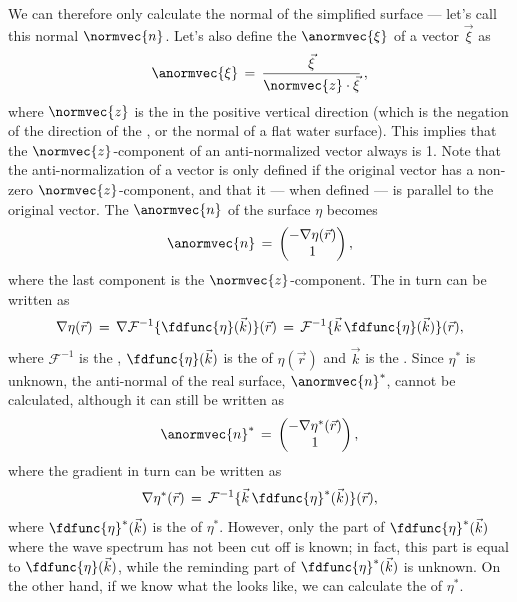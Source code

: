 We can therefore only calculate the normal of the simplified surface --- let's call this normal $\normvec{n}$. Let's also define the  $\anormvec{\xi}$ of a vector $\vec{\xi}$ as
%
\begin{equation} \label{eq:anti_normal_definition}
\anormvec{\xi} \,=\, \frac{\vec{\xi}}{\normvec{z}\cdot\vec{\xi}}\,,
\end{equation}
%
where $\normvec{z}$ is the  in the positive vertical direction (which is the negation of the direction of the , or the normal of a flat water surface). This implies that the $\normvec{z}$-component of an anti-normalized vector always is 1. Note that the anti-normalization of a vector is only defined if the original vector has a non-zero $\normvec{z}$-component, and that it --- when defined --- is parallel to the original vector. The  $\anormvec{n}$ of the surface $\eta$ becomes
%
\begin{equation} \label{eq:anti_normal_from_gradient}
\anormvec{n} \,=\, \left(\!\!\!\begin{array}{c}-\nabla\eta(\vec{r}) \\ 1\end{array}\!\!\!\right),
\end{equation}
%
where the last component is the $\normvec{z}$-component. The \gradient in turn can be written as
%
\begin{equation}
\nabla\eta(\vec{r}) \,=\, \nabla\mathcal{F}^{-1}\{\fdfunc{\eta}(\vec{k})\}(\vec{r}) \,=\, \mathcal{F}^{-1}\{\vec{k}\,\fdfunc{\eta}(\vec{k})\}(\vec{r}),
\end{equation}
%
where $\mathcal{F}^{-1}$ is the , $\fdfunc{\eta}(\vec{k})$ is the  of $\eta(\vec{r})$ and $\vec{k}$ is the . Since $\eta^*$ is unknown, the anti-normal of the real surface, $\anormvec{n}^*$, cannot be calculated, although it can still be written as
%
\begin{equation} \label{eq:eta_anti_normal}
\anormvec{n}^* \,=\, \left(\!\!\!\begin{array}{c}-\nabla\eta^*(\vec{r}) \\ 1\end{array}\!\!\!\right),
\end{equation}
%
where the gradient in turn can be written as
%
\begin{equation}
\nabla\eta^*(\vec{r}) \,=\, \mathcal{F}^{-1}\{\vec{k}\,\fdfunc{\eta}^*(\vec{k})\}(\vec{r}),
\end{equation}
%
where $\fdfunc{\eta}^*(\vec{k})$ is the  of $\eta^*$. However, only the part of $\fdfunc{\eta}^*(\vec{k})$ where the wave spectrum has not been cut off is known; in fact, this part is equal to $\fdfunc{\eta}(\vec{k})$, while the reminding part of $\fdfunc{\eta}^*(\vec{k})$ is unknown. On the other hand, if we know what the  looks like, we can calculate the  of $\eta^*$.

